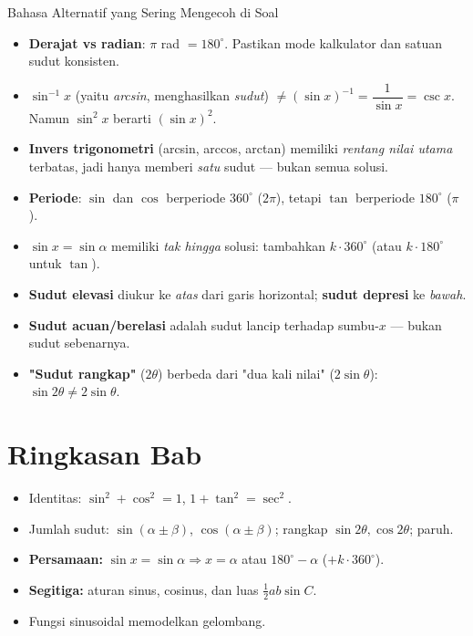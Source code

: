 \documentclass[11pt,a4paper]{report}
\theoremstyle{gaya}
\begin{document}
\begin{konsep}{Bahasa Alternatif yang Sering Mengecoh di Soal}
\begin{itemize}[leftmargin=*,topsep=2pt]
  \item \textbf{Derajat vs radian}: $\pi$ rad $=180^\circ$. Pastikan mode kalkulator dan satuan sudut konsisten.
  \item $\sin^{-1}x$ (yaitu \emph{arcsin}, menghasilkan \emph{sudut}) $\neq (\sin x)^{-1}=\dfrac{1}{\sin x}=\csc x$. Namun $\sin^2 x$ berarti $(\sin x)^2$.
  \item \textbf{Invers trigonometri} (arcsin, arccos, arctan) memiliki \emph{rentang nilai utama} terbatas, jadi hanya memberi \emph{satu} sudut --- bukan semua solusi.
  \item \textbf{Periode}: $\sin$ dan $\cos$ berperiode $360^\circ$ ($2\pi$), tetapi $\tan$ berperiode $180^\circ$ ($\pi$).
  \item $\sin x=\sin\alpha$ memiliki \emph{tak hingga} solusi: tambahkan $k\cdot360^\circ$ (atau $k\cdot180^\circ$ untuk $\tan$).
  \item \textbf{Sudut elevasi} diukur ke \emph{atas} dari garis horizontal; \textbf{sudut depresi} ke \emph{bawah}.
  \item \textbf{Sudut acuan/berelasi} adalah sudut lancip terhadap sumbu-$x$ --- bukan sudut sebenarnya.
  \item \textbf{"Sudut rangkap"} ($2\theta$) berbeda dari "dua kali nilai" ($2\sin\theta$): $\sin2\theta\neq2\sin\theta$.
\end{itemize}
\end{konsep}

\section*{Ringkasan Bab}
\begin{itemize}[leftmargin=*,topsep=2pt]
  \item Identitas: $\sin^2+\cos^2=1$, $1+\tan^2=\sec^2$.
  \item Jumlah sudut: $\sin(\alpha\pm\beta)$, $\cos(\alpha\pm\beta)$; rangkap $\sin2\theta,\cos2\theta$; paruh.
  \item \textbf{Persamaan:} $\sin x=\sin\alpha\Rightarrow x=\alpha$ atau $180^\circ-\alpha$ ($+k\cdot360^\circ$).
  \item \textbf{Segitiga:} aturan sinus, cosinus, dan luas $\tfrac12ab\sin C$.
  \item Fungsi sinusoidal memodelkan gelombang.
\end{itemize}
\end{document}
